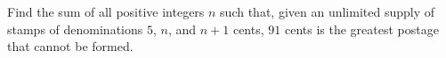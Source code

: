 Find the sum of all positive integers $n$ such that, given an unlimited supply of stamps of denominations $5$, $n$, and $n + 1$ cents, $91$ cents is the greatest postage that cannot be formed.